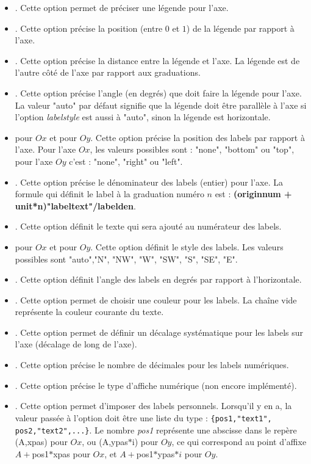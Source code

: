 \documentclass[%
10pt,%
a4paper,%
french,%
]%
{article}%
\begin{document}
\begin{itemize}
\begin{itemize}
            \item {}. Cette option permet de préciser une légende pour l'axe.
            \item {}. Cette option précise la position (entre $0$ et $1$) de la légende par rapport à l'axe.
            \item {}. Cette option précise la distance entre la légende et l'axe. La légende est de l'autre côté de l'axe par rapport aux graduations.
            \item {}. Cette option précise l'angle (en degrés) que doit faire la légende pour l'axe. La valeur "auto" par défaut signifie que la légende doit être parallèle à l'axe si l'option \emph{labelstyle} est aussi à "auto", sinon la légende est horizontale.
            \item {} pour $Ox$ et  pour $Oy$. Cette option précise la position des labels par rapport à l'axe. Pour l'axe $Ox$, les valeurs possibles sont : "none", "bottom" ou "top", pour l'axe $Oy$ c'est :  "none", "right" ou "left".
            \item {}. Cette option précise le dénominateur des labels (entier) pour l'axe. La formule qui définit le label à la graduation numéro $n$ est : \textbf{(originnum + unit*n)"labeltext"/labelden}.
            \item {}. Cette option définit le texte qui sera ajouté au numérateur des labels.
            \item {} pour $Ox$ et  pour $Oy$. Cette option définit le style des labels. Les valeurs possibles sont "auto","N", "NW", "W", "SW", "S", "SE", "E".
            \item {}. Cette option définit l'angle des labels en degrés par rapport à l'horizontale.
            \item {}. Cette option permet de choisir une couleur pour les labels. La chaîne vide représente la couleur courante du texte.
            \item {}. Cette option permet de définir un décalage systématique pour les labels sur l'axe (décalage de long de l'axe).
            \item {}. Cette option précise le nombre de décimales pour les labels numériques.
            \item {}. Cette option précise le type d'affiche numérique (non encore implémenté).
            \item {}. Cette option permet d'imposer des labels personnels. Lorsqu'il y en a, la valeur passée à l'option doit être une liste du type : \verb|{pos1,"text1", pos2,"text2",...}|. Le nombre \emph{pos1} représente une abscisse dans le repère (A,xpas) pour $Ox$, ou (A,ypas$*$i) pour $Oy$, ce qui correspond au point d'affixe $A+$pos1$*$xpas pour $Ox$, et $A+$pos1$*$ypas$*i$ pour $Oy$.
        \end{itemize}
\end{itemize}
\end{document}
